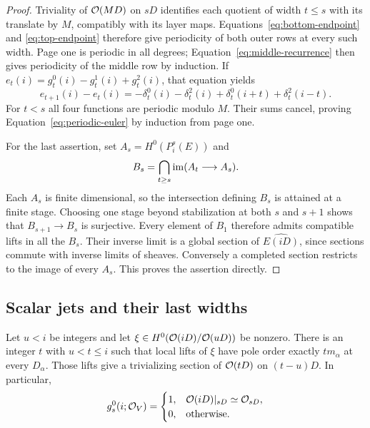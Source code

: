 \begin{proof}
Triviality of $\mathcal O(MD)$ on $sD$ identifies each quotient of width
$t\leq s$ with its translate by $M$, compatibly with its layer
maps. Equations~\ref{eq:bottom-endpoint} and
\ref{eq:top-endpoint} therefore give periodicity of both outer
rows at every such width. Page one is periodic in all degrees;
Equation~\ref{eq:middle-recurrence} then gives periodicity of
the middle row by induction. If
$e_t(i)=g_t^0(i)-g_t^1(i)+g_t^2(i)$, that equation yields
\[
 e_{t+1}(i)-e_t(i)=
 -\delta_t^0(i)-\delta_t^2(i)
 +\delta_t^0(i+t)+\delta_t^2(i-t).
\]
For $t<s$ all four functions are periodic modulo $M$.
Their sums cancel, proving Equation~\ref{eq:periodic-euler}
by induction from page one.

For the last assertion, set $A_s=H^0(P_i^s(E))$ and
\[
 B_s=\bigcap_{t\geq s}\operatorname{im}(A_t\longrightarrow A_s).
\]
Each $A_s$ is finite dimensional, so the intersection defining
$B_s$ is attained at a finite stage. Choosing one stage beyond
stabilization at both $s$ and $s+1$ shows that
$B_{s+1}\longrightarrow B_s$ is surjective. Every element of
$B_1$ therefore admits compatible lifts in all the $B_s$.
Their inverse limit is a global section of $\widehat{E(iD)}$,
since sections commute with inverse limits of sheaves. Conversely
a completed section restricts to the image of every $A_s$.
This proves the assertion directly.
\end{proof}

\subsection{Scalar jets and their last widths}

\begin{lemma}\label{lem:scalar-jets}
Let $u<i$ be integers and let
$\xi\in H^0(\mathcal O(iD)/\mathcal O(uD))$ be nonzero. There is an integer
$t$ with $u<t\leq i$ such that local lifts of $\xi$ have pole
order exactly $tm_\alpha$ at every $D_\alpha$. Those lifts
give a trivializing section of $\mathcal O(tD)$ on $(t-u)D$.
In particular,
\begin{equation}\label{eq:scalar-endpoint}
 g_s^0(i;\mathcal O_V)=
 \begin{cases}
 1,&\mathcal O(iD)|_{sD}\simeq\mathcal O_{sD},\\
 0,&\text{otherwise}.
 \end{cases}
\end{equation}
\end{lemma}

